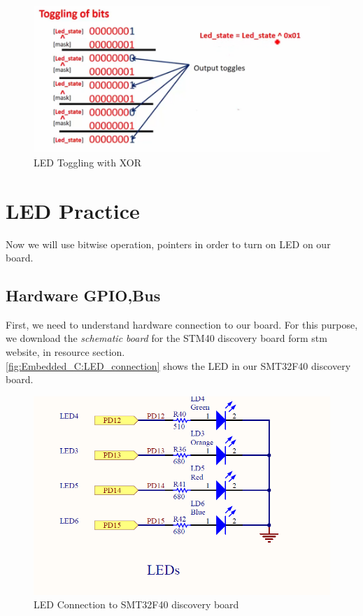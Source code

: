 \begin{figure}[h]
\centering
\includegraphics[scale=0.5]{Figures/Embedded_C/toggling_xor}
\caption{LED Toggling with XOR}
\label{fig:Embedded_C:toggling_xor}
\end{figure}

\newpage
\section{LED Practice}
\label{Sec:Led_practice}

Now we will use bitwise operation, pointers in order to turn on LED on our board. 


\subsection{Hardware GPIO,Bus}
\label{Sub:Hardware_GPIO_Bus}

First, we need to understand hardware connection to our board. For this purpose, we download the \textit{schematic board} for the STM40 discovery board form stm website, in resource section.\\

\autoref{fig:Embedded_C:LED_connection} shows the LED in our SMT32F40 discovery board.
 
 
\begin{figure}[h]
\centering
\includegraphics[scale=0.7]{Figures/Embedded_C/LED_connection}
\caption{LED Connection to SMT32F40 discovery board}
\label{fig:Embedded_C:LED_connection}
\end{figure}

